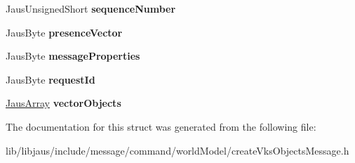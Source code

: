 \begin{DoxyCompactItemize}
\item 
\hypertarget{struct_create_vks_objects_message_struct_ab8dae60c488a47221dc7ddc1bea8a29c}{\-Jaus\-Unsigned\-Short {\bfseries sequence\-Number}}\label{struct_create_vks_objects_message_struct_ab8dae60c488a47221dc7ddc1bea8a29c}

\item 
\hypertarget{struct_create_vks_objects_message_struct_af80e94a802b0730e59b7a56657e566d1}{\-Jaus\-Byte {\bfseries presence\-Vector}}\label{struct_create_vks_objects_message_struct_af80e94a802b0730e59b7a56657e566d1}

\item 
\hypertarget{struct_create_vks_objects_message_struct_a3d6990215d0910d947e6d24d0146c64f}{\-Jaus\-Byte {\bfseries message\-Properties}}\label{struct_create_vks_objects_message_struct_a3d6990215d0910d947e6d24d0146c64f}

\item 
\hypertarget{struct_create_vks_objects_message_struct_a231f6c0f8a7f40e8d80bf5847a9ad8c7}{\-Jaus\-Byte {\bfseries request\-Id}}\label{struct_create_vks_objects_message_struct_a231f6c0f8a7f40e8d80bf5847a9ad8c7}

\item 
\hypertarget{struct_create_vks_objects_message_struct_a8043ecf874b3dac4068ece40a2cbe27b}{\hyperlink{struct_jaus_array_struct}{\-Jaus\-Array} {\bfseries vector\-Objects}}\label{struct_create_vks_objects_message_struct_a8043ecf874b3dac4068ece40a2cbe27b}

\end{DoxyCompactItemize}


\-The documentation for this struct was generated from the following file\-:\begin{DoxyCompactItemize}
\item 
lib/libjaus/include/message/command/world\-Model/create\-Vks\-Objects\-Message.\-h\end{DoxyCompactItemize}
